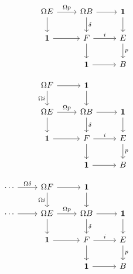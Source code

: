 \documentclass[handout]{beamer}
\newcommand{\unit}{\mathbf{1}}
\begin{document}
\begin{frame}
  \begin{equation*}
    \begin{tikzcd}[ampersand replacement=\&]
      \phantom{\cdots} \arrow[r,phantom,"\phantom{\Omega\delta}"] \& \phantom{\Omega F} \arrow[r,phantom] \arrow[d,phantom,"\phantom{\Omega i}"] \& \phantom{\unit} \arrow[d,phantom] \\
      \phantom{\cdots} \arrow[r,phantom] \& \Omega E \arrow[r,"\Omega p"] \arrow[d] \& \Omega B \arrow[d,"\delta"] \arrow[r] \& \unit \arrow[d] \\
      \& \unit \arrow[r] \& F \arrow[r,"i"] \arrow[d] \& E \arrow[d,"p"] \\
      \& \& \unit \arrow[r] \& B
    \end{tikzcd}
  \end{equation*}
\end{frame}

\begin{frame}
  \begin{equation*}
    \begin{tikzcd}[ampersand replacement=\&]
      \phantom{\cdots} \arrow[r,phantom,"\phantom{\Omega\delta}"] \& \Omega F \arrow[r] \arrow[d,swap,"\Omega i"] \& \unit \arrow[d] \\
      \phantom{\cdots} \arrow[r,phantom] \& \Omega E \arrow[r,"\Omega p"] \arrow[d] \& \Omega B \arrow[d,"\delta"] \arrow[r] \& \unit \arrow[d] \\
      \& \unit \arrow[r] \& F \arrow[r,"i"] \arrow[d] \& E \arrow[d,"p"] \\
      \& \& \unit \arrow[r] \& B
    \end{tikzcd}
  \end{equation*}
\end{frame}

\begin{frame}
  \begin{equation*}
    \begin{tikzcd}[ampersand replacement=\&]
      \cdots \arrow[r,"\Omega\delta"] \& \Omega F \arrow[r] \arrow[d,swap,"\Omega i"] \& \unit \arrow[d] \\
      \cdots \arrow[r] \& \Omega E \arrow[r,"\Omega p"] \arrow[d] \& \Omega B \arrow[d,"\delta"] \arrow[r] \& \unit \arrow[d] \\
      \& \unit \arrow[r] \& F \arrow[r,"i"] \arrow[d] \& E \arrow[d,"p"] \\
      \& \& \unit \arrow[r] \& B
    \end{tikzcd}
  \end{equation*}
\end{frame}
\end{document}
